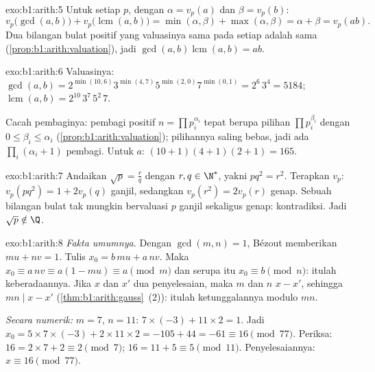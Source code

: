 \begin{solution}{exo:b1:arith:5}
Untuk setiap  $p$, dengan $\alpha = v_p(a)$ dan $\beta = v_p(b)$:
\[
v_p\bigl(\gcd(a,b)\bigr) + v_p\bigl(\operatorname{lcm}(a,b)\bigr)
= \min(\alpha, \beta) + \max(\alpha, \beta)
= \alpha + \beta = v_p(ab) .
\]
Dua bilangan bulat positif yang valuasinya sama pada setiap  adalah sama
(\cref{prop:b1:arith:valuation}), jadi $\gcd(a,b)\operatorname{lcm}(a,b)
= ab$.
\end{solution}

\begin{solution}{exo:b1:arith:6}
Valuasinya: $\gcd(a, b) = 2^{\min(10,6)} 3^{\min(4,7)} 5^{\min(2,0)}
7^{\min(0,1)} = 2^6\, 3^4 = 5184$;
$\operatorname{lcm}(a,b) = 2^{10}\, 3^7\, 5^2\, 7$.

Cacah pembaginya: pembagi positif $n = \prod p_i^{\alpha_i}$ tepat
berupa pilihan $\prod p_i^{\beta_i}$ dengan $0 \leq \beta_i \leq
\alpha_i$ (\cref{prop:b1:arith:valuation}); pilihannya saling
bebas, jadi ada $\prod_i (\alpha_i + 1)$ pembagi. Untuk $a$:
$(10+1)(4+1)(2+1) = 165$.
\end{solution}

\begin{solution}{exo:b1:arith:7}
Andaikan $\sqrt p = \frac rq$ dengan $r, q \in \N^*$, yakni $p q^2 =
r^2$. Terapkan $v_p$: $v_p(pq^2) = 1 + 2v_p(q)$ ganjil, sedangkan $v_p(r^2)
= 2 v_p(r)$ genap. Sebuah bilangan bulat tak mungkin bervaluasi $p$ ganjil
sekaligus genap: kontradiksi. Jadi $\sqrt p \notin \Q$.
\end{solution}

\begin{solution}{exo:b1:arith:8}
\emph{Fakta umumnya.} Dengan $\gcd(m,n) = 1$, Bézout memberikan $mu + nv = 1$.
Tulis $x_0 = b\,mu + a\,nv$. Maka $x_0 \equiv a\,nv \equiv a(1 - mu)
\equiv a \pmod m$ dan serupa itu $x_0 \equiv b \pmod n$: itulah keberadaannya. Jika
$x$ dan $x'$ dua penyelesaian, maka $m$ dan $n$  $x - x'$, sehingga
$mn \mid x - x'$ (\cref{thm:b1:arith:gauss}~(2)): itulah ketunggalannya modulo
$mn$.

\emph{Secara numerik:} $m = 7$, $n = 11$: $7 \times (-3) + 11 \times 2 =
1$. Jadi $x_0 = 5 \times 7 \times (-3) + 2 \times 11 \times 2 = -105 +
44 = -61 \equiv 16 \pmod{77}$. Periksa: $16 = 2\times 7 + 2 \equiv 2
\pmod 7$; $16 = 11 + 5 \equiv 5 \pmod{11}$. Penyelesaiannya: $x \equiv 16
\pmod{77}$.
\end{solution}

